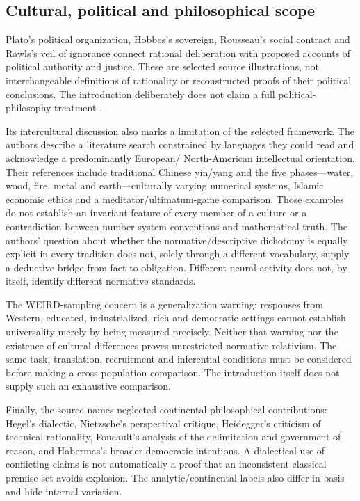 \subsection{Cultural, political and philosophical scope}

Plato's political organization, Hobbes's sovereign, Rousseau's social
contract and Rawls's veil of ignorance connect rational deliberation
with proposed accounts of political authority and justice. These
are selected source illustrations, not interchangeable definitions of
rationality or reconstructed proofs of their political conclusions.
The introduction deliberately does not claim a full political-philosophy
treatment \cite[pp.~49--50]{KnauffSpohn2021FrameworksIntro}.

Its intercultural discussion also marks a limitation of the selected
framework. The authors describe a literature search constrained by
languages they could read and acknowledge a predominantly European/
North-American intellectual orientation. Their references include
traditional Chinese yin/yang and the five phases---water, wood, fire,
metal and earth---culturally varying numerical systems,
Islamic economic ethics and a meditator/ultimatum-game comparison.
Those examples do not establish an invariant feature of every member
of a culture or a contradiction between number-system conventions
and mathematical truth. The authors' question about whether the
normative/descriptive dichotomy is equally explicit in every tradition
does not, solely through a different vocabulary, supply a deductive
bridge from fact to obligation. Different neural activity does not,
by itself, identify different normative standards.

The WEIRD-sampling concern is a generalization warning: responses
from Western, educated, industrialized, rich and democratic settings
cannot establish universality merely by being measured precisely.
Neither that warning nor the existence of cultural differences proves
unrestricted normative relativism. The same task, translation,
recruitment and inferential conditions must be considered before
making a cross-population comparison. The introduction itself
does not supply such an exhaustive comparison.

Finally, the source names neglected continental-philosophical
contributions: Hegel's dialectic, Nietzsche's perspectival critique,
Heidegger's criticism of technical rationality, Foucault's analysis
of the delimitation and government of reason, and Habermas's broader
democratic intentions. A dialectical use of conflicting claims is
not automatically a proof that an inconsistent classical premise
set avoids explosion. The analytic/continental labels also differ
in basis and hide internal variation.

